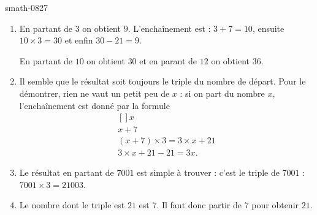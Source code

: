 
\begin{corrige}{smath-0827}

    \begin{enumerate}
        \item
            En partant de \( 3\) on obtient \( 9\). L'enchaînement est : \( 3+7=10\), ensuite \( 10\times 3=30\) et enfin \( 30-21=9\).
            
            En partant de \( 10\) on obtient \( 30\) et en parant de \( 12\) on obtient \( 36\).
        \item
            Il semble que le résultat soit toujours le triple du nombre de départ. Pour le démontrer, rien ne vaut un petit peu de \( x\) : si on part du nombre \( x\), l'enchaînement est donné par la formule
            \begin{equation}
                \begin{aligned}[]
                    x\\
                    x+7\\
                    (x+7)\times 3=3\times x+21\\
                    3\times x+21-21=3x.
                \end{aligned}
            \end{equation}
        \item
            Le résultat en partant de \( 7001\) est simple à trouver : c'est le triple de \( 7001\) : \( 7001\times 3=21003\).
        \item
            Le nombre dont le triple est \( 21\) est \( 7\). Il faut donc partir de \( 7\) pour obtenir \( 21\).
    \end{enumerate}
\end{corrige}
